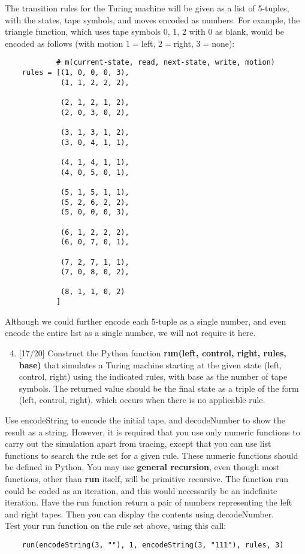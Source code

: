 \documentclass[12pt,letterpaper,boxed,cm]{hmcpset}
\newcommand{\tb}[1]{\textbf{#1}}
\begin{document}
    \begin{problem}[3. cont.]
    The transition rules for the Turing machine will be given as a list of 5-tuples, with the states, tape symbols, and moves encoded as numbers. For example, the triangle function, which uses tape symbols {0, 1, 2} with 0 as blank, would be encoded as follows (with motion $1 = $left, $2 = $right, $3 = $none):
    \begin{lstlisting}
            # m(current-state, read, next-state, write, motion)
    rules = [(1, 0, 0, 0, 3),
             (1, 1, 2, 2, 2),

             (2, 1, 2, 1, 2),
             (2, 0, 3, 0, 2),

             (3, 1, 3, 1, 2),
             (3, 0, 4, 1, 1),

             (4, 1, 4, 1, 1),
             (4, 0, 5, 0, 1),

             (5, 1, 5, 1, 1),
             (5, 2, 6, 2, 2),
             (5, 0, 0, 0, 3),

             (6, 1, 2, 2, 2),
             (6, 0, 7, 0, 1),

             (7, 2, 7, 1, 1),
             (7, 0, 8, 0, 2),

             (8, 1, 1, 0, 2)
            ]
    \end{lstlisting}
    Although we could further encode each 5-tuple as a single number, and even encode the
    entire list as a single number, we will not require it here. 
    \begin{enumerate}[label=\alph*.]
        \setcounter{enumi}{3}
        \item {[17/20]} Construct the Python function \tb{run(left, control, right, rules, base)} that simulates a Turing machine starting at the given state (left, control, right) using the indicated rules, with base as the number of tape symbols. The returned value should be the final state as a triple of the form (left, control, right), which occurs when there is no applicable rule.
    \end{enumerate}
    Use encodeString to encode the initial tape, and decodeNumber to show the result as a string. However, it is required that you use only numeric functions to carry out the simulation apart from tracing, except that you can use list functions to search the rule set for a given rule. These numeric functions should be defined in Python. You may use \tb{general recursion}, even though most functions, other than \tb{run} itself, will be primitive recursive. The function run could be coded as an iteration, and this would necessarily be an indefinite iteration. Have the run function return a pair of numbers representing the left and right tapes. Then you can display the contents using decodeNumber.\\
    Test your run function on the rule set above, using this call:
    \begin{lstlisting}
    run(encodeString(3, ""), 1, encodeString(3, "111"), rules, 3)
    \end{lstlisting}
\end{problem}
\end{document}
